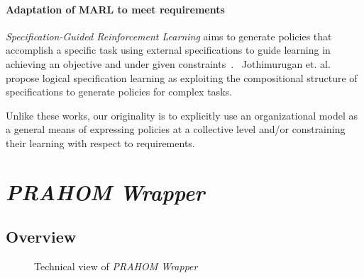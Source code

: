 \documentclass{ecai}
\begin{document}
\paragraph{\textbf{Adaptation of MARL to meet requirements}}
%
%
\emph{Specification-Guided Reinforcement Learning} aims to generate policies that accomplish a specific task using external specifications to guide learning in achieving an objective and under given constraints~\cite{Bansal2022}.%
%
%
~Jothimurugan et. al.~\cite{Jothimurugan2021} propose logical specification learning as exploiting the compositional structure of specifications to generate policies for complex tasks.

Unlike these works, our originality is to explicitly use an organizational model as a general means of expressing policies at a collective level and/or constraining their learning with respect to requirements.




\section{\emph{PRAHOM Wrapper}}

\subsection{Overview}

\begin{figure}[h!]
\centering

\caption{Technical view of \emph{PRAHOM Wrapper}}
\label{fig:prahom_wrapper_technical_view}
\end{figure}
\end{document}
